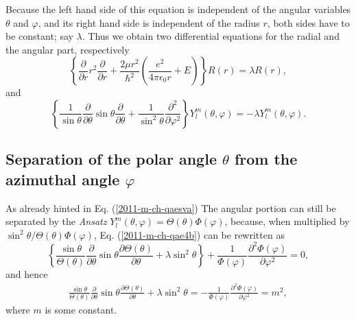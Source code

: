 Because the left hand side of this equation is independent of the angular variables
$\theta $ and $\varphi$, and its right hand side is independent of the radius $r$,
both sides have to be constant; say $\lambda $.
Thus we obtain two
differential equations for the radial and the angular part,
respectively
\begin{equation}
\left\{  \frac{\partial}{\partial r} r^2\frac{\partial}{\partial r}  +
\frac{2\mu r^2}{\hbar^2} \left(\frac{e^2}{4\pi \epsilon_0 r} + E \right) \right\} R(r)
 =  \lambda  R( r )  ,
\label{2011-m-ch-qae4a}
\end{equation}
and
\begin{equation}
\left\{
\frac{1}{\sin \theta}   \frac{\partial}{\partial \theta }
\sin \theta \frac{\partial}{\partial \theta }
+
\frac{1}{\sin^2 \theta} \frac{\partial^2}{\partial \varphi^2 }
\right\}
Y_l^m ( \theta ,\varphi )   =  -  \lambda  Y_l^m ( \theta ,\varphi ).
\label{2011-m-ch-qae4b}
\end{equation}


\subsection{Separation of the polar angle $\theta$ from the azimuthal angle $\varphi $}

As already hinted in Eq. (\ref{2011-m-ch-qaesva})
The angular portion can still be separated by the {\em Ansatz}
$Y_l^m ( \theta ,\varphi )   = \Theta(\theta)\Phi(\varphi)$,
because, when multiplied by $\sin^2 \theta /\Theta(\theta)\Phi(\varphi)$,
Eq.   (\ref{2011-m-ch-qae4b})
can be rewritten as
\begin{equation}
\left\{
\frac{\sin \theta}{\Theta(\theta)}
\frac{\partial}{\partial \theta }
\sin \theta \frac{\partial \Theta(\theta)}{\partial \theta }
+  \lambda  \sin^2 \theta   \right\}
+
\frac{1}{\Phi(\varphi)} \frac{\partial^2\Phi(\varphi)}{\partial \varphi^2 }
= 0,
\label{2011-m-ch-qae4bc}
\end{equation}
and hence
\begin{equation}
\begin{array}{l}
\frac{\sin \theta}{\Theta(\theta)}
\frac{\partial}{\partial \theta }
\sin \theta \frac{\partial \Theta(\theta)}{\partial \theta }
+  \lambda  \sin^2 \theta
  = -
\frac{1}{\Phi(\varphi)} \frac{\partial^2\Phi(\varphi)}{\partial \varphi^2 }
=  m^2,
\end{array}
\label{2011-m-ch-qae8}
\end{equation}
where $m$ is some constant.

